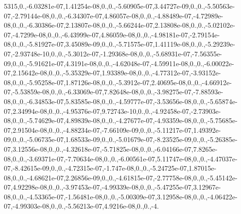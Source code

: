 \begin{DoxyCompactItemize}
5315,0.,-\/6.\-03281e-\/07,1.\-41254e-\/08,0.,0.,-\/5.\-60905e-\/07,3.\-44727e-\/09,0.,0.,-\/5.\-50563e-\/07,-\/2.\-79144e-\/08,0.,0.,-\/6.\-34307e-\/07,4.\-86057e-\/08,0.,0.,-\/4.\-88489e-\/07,-\/4.\-72989e-\/08,0.,0.,-\/6.\-30386e-\/07,2.\-13807e-\/08,0.,0.,-\/5.\-66244e-\/07,2.\-13808e-\/08,0.,0.,-\/5.\-02102e-\/07,-\/4.\-7299e-\/08,0.,0.,-\/6.\-43999e-\/07,4.\-86059e-\/08,0.,0.,-\/4.\-98181e-\/07,-\/2.\-79154e-\/08,0.,0.,-\/5.\-81927e-\/07,3.\-45089e-\/09,0.,0.,-\/5.\-71575e-\/07,1.\-41119e-\/08,0.,0.,-\/5.\-29239e-\/07,-\/2.\-93748e-\/10,0.,0.,-\/5.\-3012e-\/07,-\/1.\-29368e-\/08,0.,0.,-\/5.\-68931e-\/07,-\/7.\-56355e-\/09,0.,0.,-\/5.\-91621e-\/07,4.\-3191e-\/08,0.,0.,-\/4.\-62048e-\/07,-\/4.\-59911e-\/08,0.,0.,-\/6.\-00022e-\/07,2.\-15642e-\/08,0.,0.,-\/5.\-35329e-\/07,1.\-93389e-\/08,0.,0.,-\/4.\-77312e-\/07,-\/3.\-93152e-\/08,0.,0.,-\/5.\-95258e-\/07,1.\-87126e-\/08,0.,0.,-\/5.\-3912e-\/07,2.\-40695e-\/08,0.,0.,-\/4.\-66912e-\/07,-\/5.\-53859e-\/08,0.,0.,-\/6.\-33069e-\/07,7.\-82648e-\/08,0.,0.,-\/3.\-98275e-\/07,-\/7.\-88593e-\/08,0.,0.,-\/6.\-34853e-\/07,5.\-83585e-\/08,0.,0.,-\/4.\-59777e-\/07,-\/3.\-53656e-\/08,0.,0.,-\/5.\-65874e-\/07,2.\-34994e-\/08,0.,0.,-\/4.\-95376e-\/07,9.\-72743e-\/10,0.,0.,-\/4.\-92458e-\/07,-\/2.\-73903e-\/08,0.,0.,-\/5.\-74629e-\/07,4.\-89839e-\/08,0.,0.,-\/4.\-27677e-\/07,-\/4.\-93359e-\/08,0.,0.,-\/5.\-75685e-\/07,2.\-91504e-\/08,0.,0.,-\/4.\-88234e-\/07,-\/7.\-66109e-\/09,0.,0.,-\/5.\-11217e-\/07,1.\-49392e-\/09,0.,0.,-\/5.\-06735e-\/07,1.\-68533e-\/09,0.,0.,-\/5.\-01679e-\/07,-\/8.\-23525e-\/09,0.,0.,-\/5.\-26385e-\/07,3.\-12556e-\/08,0.,0.,-\/4.\-32618e-\/07,-\/5.\-71825e-\/08,0.,0.,-\/6.\-04166e-\/07,7.\-8265e-\/08,0.,0.,-\/3.\-69371e-\/07,-\/7.\-70634e-\/08,0.,0.,-\/6.\-00561e-\/07,5.\-11747e-\/08,0.,0.,-\/4.\-47037e-\/07,-\/8.\-42615e-\/09,0.,0.,-\/4.\-72315e-\/07,-\/1.\-747e-\/08,0.,0.,-\/5.\-24725e-\/07,1.\-87015e-\/08,0.,0.,-\/4.\-68621e-\/07,2.\-26856e-\/09,0.,0.,-\/4.\-61815e-\/07,-\/2.\-77758e-\/08,0.,0.,-\/5.\-45142e-\/07,4.\-92298e-\/08,0.,0.,-\/3.\-97453e-\/07,-\/4.\-99339e-\/08,0.,0.,-\/5.\-47255e-\/07,3.\-12967e-\/08,0.,0.,-\/4.\-53365e-\/07,-\/1.\-56481e-\/08,0.,0.,-\/5.\-00309e-\/07,3.\-12958e-\/08,0.,0.,-\/4.\-06422e-\/07,-\/4.\-99303e-\/08,0.,0.,-\/5.\-56213e-\/07,4.\-9216e-\/08,0.,0.,-\/4.
\end{DoxyCompactItemize}
